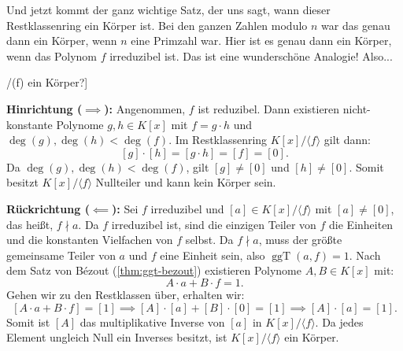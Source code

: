 \begin{spoken-clean}[00:53:37 - 00:57:19]
Und jetzt kommt der ganz wichtige Satz, der uns sagt, wann dieser Restklassenring ein Körper ist. Bei den ganzen Zahlen modulo $n$ war das genau dann ein Körper, wenn $n$ eine Primzahl war. Hier ist es genau dann ein Körper, wenn das Polynom $f$ irreduzibel ist. Das ist eine wunderschöne Analogie! Also...
\end{spoken-clean}

\begin{math-stroke}[Wann ist K[x]/(f) ein Körper?]

\begin{short-proof}
\textbf{Hinrichtung ($\implies$):} Angenommen, $f$ ist reduzibel. Dann existieren nicht-konstante Polynome $g, h \in K[x]$ mit $f = g \cdot h$ und $\deg(g), \deg(h) < \deg(f)$.
Im Restklassenring $K[x]/\langle f \rangle$ gilt dann:
\[
[g] \cdot [h] = [g \cdot h] = [f] = [0].
\]
Da $\deg(g), \deg(h) < \deg(f)$, gilt $[g] \neq [0]$ und $[h] \neq [0]$. Somit besitzt $K[x]/\langle f \rangle$ Nullteiler und kann kein Körper sein.

\textbf{Rückrichtung ($\impliedby$):} Sei $f$ irreduzibel und $[a] \in K[x]/\langle f \rangle$ mit $[a] \neq [0]$, das heißt, $f \nmid a$.
Da $f$ irreduzibel ist, sind die einzigen Teiler von $f$ die Einheiten und die konstanten Vielfachen von $f$ selbst. Da $f \nmid a$, muss der größte gemeinsame Teiler von $a$ und $f$ eine Einheit sein, also $\operatorname{ggT}(a, f) = 1$.
Nach dem Satz von Bézout (\cref{thm:ggt-bezout}) existieren Polynome $A, B \in K[x]$ mit:
\[
A \cdot a + B \cdot f = 1.
\]
Gehen wir zu den Restklassen über, erhalten wir:
\[
[A \cdot a + B \cdot f] = [1] \implies [A] \cdot [a] + [B] \cdot [0] = [1] \implies [A] \cdot [a] = [1].
\]
Somit ist $[A]$ das multiplikative Inverse von $[a]$ in $K[x]/\langle f \rangle$. Da jedes Element ungleich Null ein Inverses besitzt, ist $K[x]/\langle f \rangle$ ein Körper.
\end{short-proof}


\end{math-stroke}
